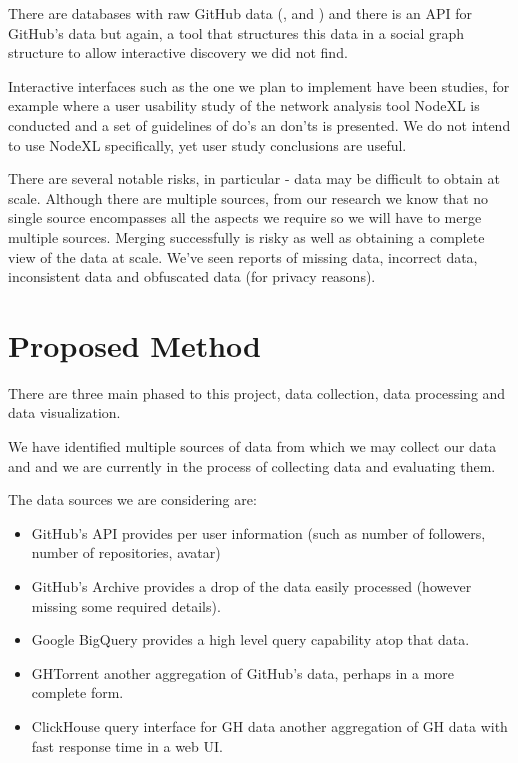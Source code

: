 \documentclass[sigconf,11pt]{acmart}
\begin{document}
There are databases with raw GitHub data (\cite{ghtorrent}, \cite{gharchive} and \cite{bq-gh})
and there is an API for GitHub's data\cite{gh-api} but again, a tool that structures this data
in a social graph structure to allow interactive discovery we did not find.

Interactive interfaces such as the one we plan to implement have been studies,
for example \citeauthor{do-you-know-the-way-to-sna} \cite{do-you-know-the-way-to-sna}
where a user usability study of the network analysis tool NodeXL is conducted and a set of guidelines of do's an don'ts is presented.
We do not intend to use NodeXL specifically, yet user study conclusions are useful.

There are several notable risks, in particular - data may be difficult to obtain at scale.
Although there are multiple sources, from our research we know that no single source encompasses all the aspects
we require so we will have to merge multiple sources.
Merging successfully is risky as well as obtaining a complete view of the data at scale.
We've seen reports of missing data, incorrect data, inconsistent data and obfuscated data
(for privacy reasons)\cite{promises-and-perils-mining-github}.

\section*{Proposed Method}

There are three main phased to this project, data collection, data processing and data visualization.

We have identified multiple sources of data from which we may collect our data and and we are currently
in the process of collecting data and evaluating them.

The data sources we are considering are:
\begin{itemize}
    \item GitHub's API \cite{gh-api} provides per user information (such as number of followers, number of repositories, avatar)
    \item GitHub's Archive \cite{gharchive} provides a drop of the data easily processed (however missing some required details).
    \item Google BigQuery \cite{bq-gh} provides a high level query capability atop that data.
    \item GHTorrent \cite{ghtorrent} another aggregation of GitHub's data, perhaps in a more complete form.
    \item ClickHouse query interface for GH data \cite{ghe.clickhouse.tech} another aggregation of GH data with fast response time in a web UI.
\end{itemize}
\end{document}
